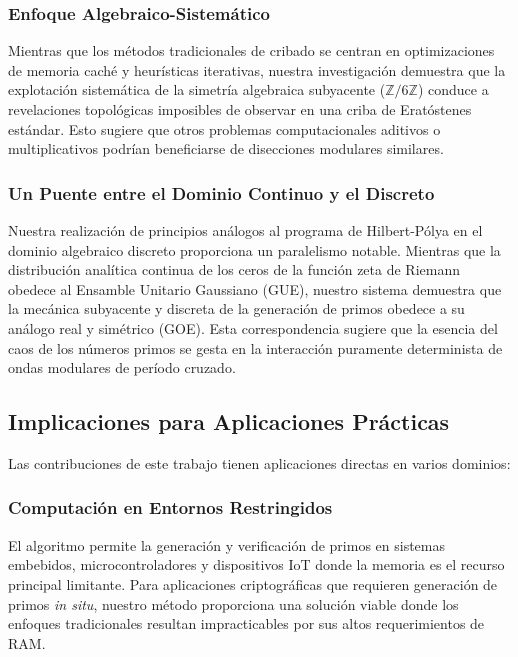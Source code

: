 \documentclass{article}
\numberwithin{equation}{section}
\theoremstyle{plain}
\theoremstyle{definition}
\begin{document}
\subsubsection{Enfoque Algebraico-Sistemático}

Mientras que los métodos tradicionales de cribado se centran en optimizaciones de memoria caché y heurísticas iterativas, nuestra investigación demuestra que la explotación sistemática de la simetría algebraica subyacente ($\mathbb{Z}/6\mathbb{Z}$) conduce a revelaciones topológicas imposibles de observar en una criba de Eratóstenes estándar. Esto sugiere que otros problemas computacionales aditivos o multiplicativos podrían beneficiarse de disecciones modulares similares.

\subsubsection{Un Puente entre el Dominio Continuo y el Discreto}

Nuestra realización de principios análogos al programa de Hilbert-Pólya en el dominio algebraico discreto proporciona un paralelismo notable. Mientras que la distribución analítica continua de los ceros de la función zeta de Riemann obedece al Ensamble Unitario Gaussiano (GUE), nuestro sistema demuestra que la mecánica subyacente y discreta de la generación de primos obedece a su análogo real y simétrico (GOE). Esta correspondencia sugiere que la esencia del caos de los números primos se gesta en la interacción puramente determinista de ondas modulares de período cruzado.

\subsection{Implicaciones para Aplicaciones Prácticas}

Las contribuciones de este trabajo tienen aplicaciones directas en varios dominios:

\subsubsection{Computación en Entornos Restringidos}

El algoritmo permite la generación y verificación de primos en sistemas embebidos, microcontroladores y dispositivos IoT donde la memoria es el recurso principal limitante. Para aplicaciones criptográficas que requieren generación de primos \textit{in situ}, nuestro método proporciona una solución viable donde los enfoques tradicionales resultan impracticables por sus altos requerimientos de RAM.
\end{document}
